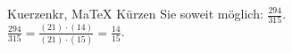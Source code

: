 \begin{MAufgabe}{Kuerzen}{kr, MaTeX}
K\"urzen Sie soweit m\"oglich: $\frac{294}{315}$.\\ 
\ifLsg\MLoesung
\quad $\frac{294}{315}=\frac{(21)\cdot(14)}{(21)\cdot(15)}=\frac{14}{15}$.\else\relax\fi
 \end{MAufgabe}